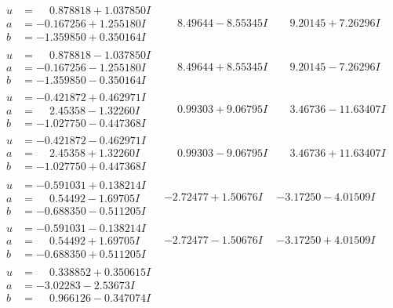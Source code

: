 \documentclass[1p]{elsarticle_modified}
\theoremstyle{definition}
\begin{document}
$$\begin{array}{c|c|c}
\begin{aligned}
u &= \phantom{-}0.878818 + 1.037850 I \\
a &= -0.167256 + 1.255180 I \\
b &= -1.359850 + 0.350164 I\end{aligned}
 & \phantom{-}8.49644 - 8.55345 I & \phantom{-}9.20145 + 7.26296 I \\ \hline\begin{aligned}
u &= \phantom{-}0.878818 - 1.037850 I \\
a &= -0.167256 - 1.255180 I \\
b &= -1.359850 - 0.350164 I\end{aligned}
 & \phantom{-}8.49644 + 8.55345 I & \phantom{-}9.20145 - 7.26296 I \\ \hline\begin{aligned}
u &= -0.421872 + 0.462971 I \\
a &= \phantom{-}2.45358 - 1.32260 I \\
b &= -1.027750 - 0.447368 I\end{aligned}
 & \phantom{-}0.99303 + 9.06795 I & \phantom{-}3.46736 - 11.63407 I \\ \hline\begin{aligned}
u &= -0.421872 - 0.462971 I \\
a &= \phantom{-}2.45358 + 1.32260 I \\
b &= -1.027750 + 0.447368 I\end{aligned}
 & \phantom{-}0.99303 - 9.06795 I & \phantom{-}3.46736 + 11.63407 I \\ \hline\begin{aligned}
u &= -0.591031 + 0.138214 I \\
a &= \phantom{-}0.54492 - 1.69705 I \\
b &= -0.688350 - 0.511205 I\end{aligned}
 & -2.72477 + 1.50676 I & -3.17250 - 4.01509 I \\ \hline\begin{aligned}
u &= -0.591031 - 0.138214 I \\
a &= \phantom{-}0.54492 + 1.69705 I \\
b &= -0.688350 + 0.511205 I\end{aligned}
 & -2.72477 - 1.50676 I & -3.17250 + 4.01509 I \\ \hline\begin{aligned}
u &= \phantom{-}0.338852 + 0.350615 I \\
a &= -3.02283 - 2.53673 I \\
b &= \phantom{-}0.966126 - 0.347074 I\end{aligned}

\end{array}$$
\end{document}
